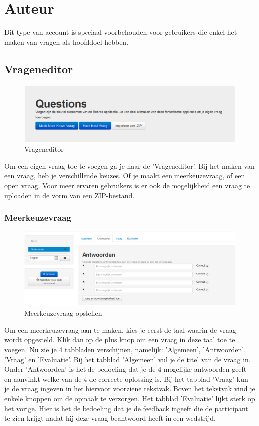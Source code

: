\documentclass[]{article}
\begin{document}
\section{Auteur}

Dit type van account is speciaal voorbehouden voor gebruikers die enkel het maken van vragen als hoofddoel hebben.

\subsection{Vrageneditor}

\begin{figure}[!ht]
	\centering
	\includegraphics[width=1\textwidth]{img/questioneditor}
	\caption{Vrageneditor}
	\label{questioneditor}
\end{figure}

Om een eigen vraag toe te voegen ga je naar de 'Vrageneditor'. Bij het maken van een vraag, heb je verschillende keuzes. Of je maakt een meerkeuzevraag, of een open vraag. Voor meer ervaren gebruikers is er ook de mogelijkheid een vraag te uploaden in de vorm van een ZIP-bestand.

\subsubsection{Meerkeuzevraag}

\begin{figure}[!ht]
	\centering
	\includegraphics[width=1\textwidth]{img/mcq}
	\caption{Meerkeuzevraag opstellen}
	\label{mcq}
\end{figure}

Om een meerkeuzevraag aan te maken, kies je eerst de taal waarin de vraag wordt opgesteld. Klik dan op de plus knop om een vraag in deze taal toe te voegen. Nu zie je 4 tabbladen verschijnen, namelijk: 'Algemeen', 'Antwoorden', 'Vraag' en 'Evaluatie'. Bij het tabblad 'Algemeen' vul je de titel van de vraag in. Onder 'Antwoorden' is het de bedoeling dat je de 4 mogelijke antwoorden geeft en aanvinkt welke van de 4 de correcte oplossing is. Bij het tabblad 'Vraag' kun je de vraag ingeven in het hiervoor voorziene tekstvak. Boven het tekstvak vind je enkele knoppen om de opmaak te verzorgen. Het tabblad 'Evaluatie' lijkt sterk op het vorige. Hier is het de bedoeling dat je de feedback ingeeft die de participant te zien krijgt nadat hij deze vraag beantwoord heeft in een wedstrijd. 
\end{document}
